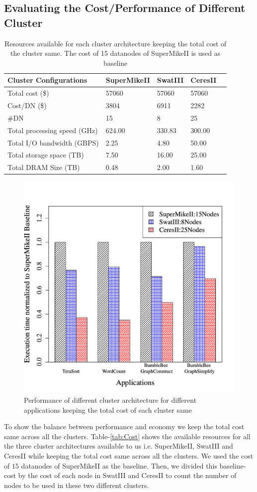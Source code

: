 \documentclass[journal]{IEEEtran}
\begin{document}
\subsection{Evaluating the Cost/Performance of Different Cluster}
\begin{table}[!t]
\caption{Resources available for each cluster architecture keeping the total cost of the cluster same. The cost of 15 datanodes of SuperMikeII is used as baseline}
\label{tab:ScalingCost}
\label{fig:perf}
\centering
\begin{tabular}{|p{2.5cm}|p{1.5cm}|p{1.5cm}|p{1.5cm}|p{1.5cm}|} \hline
Cluster Configurations & SuperMikeII & SwatIII & CeresII\\ \hline
Total cost (\$) & 57060 & 57060 & 57060\\ \hline
Cost/DN (\$) & 3804 & 6911 & 2282\\ \hline
\#DN & 15 & 8 & 25\\ \hline
Total processing speed (GHz) & 624.00 & 330.83 & 300.00\\ \hline
Total I/O bandwidth (GBPS) & 2.25 & 4.80 & 50.00\\ \hline
Total storage space (TB) & 7.50 & 16.00 & 25.00\\ \hline
Total DRAM Size (TB) & 0.48 & 2.00 & 1.60\\ \hline
\end{tabular}
\end{table}
\begin{figure}[!t]
\centering
\includegraphics[width=.5\textwidth]{Figures/PerformanceFigures/execTime.pdf}
\caption{Performance of different cluster architecture for different applications keeping the total cost of each cluster same}
\end{figure}
To show the balance between performance and economy we keep the total cost same across all the clusters. Table-\ref{tab:Cost} shows the available resources for all the three cluster architectures available to us i.e. SuperMikeII, SwatIII and CeresII while keeping the total cost same across all the clusters. We used the cost of $15$ datanodes of SuperMikeII as the baseline. Then, we divided this baseline-cost by the cost of each node in SwatIII and CeresII to count the number of nodes to be used in these two different clusters.
\end{document}
